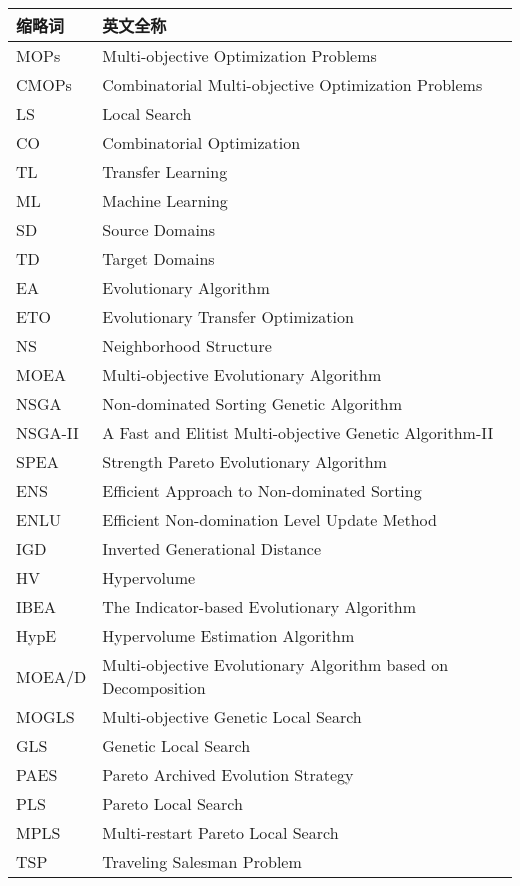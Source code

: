 \noindent\begin{longtabu} to \textwidth {|X[1,c]|X[4,c]|}\hline
缩略词 & 英文全称 \\ \hline
MOPs & Multi-objective Optimization Problems \\ \hline
CMOPs & Combinatorial Multi-objective Optimization Problems \\ \hline
LS & Local Search \\ \hline
CO & Combinatorial Optimization \\ \hline
TL & Transfer Learning \\ \hline
ML & Machine Learning \\ \hline
SD & Source Domains \\ \hline
TD & Target Domains \\ \hline
EA & Evolutionary Algorithm \\ \hline
ETO & Evolutionary Transfer Optimization \\ \hline
NS & Neighborhood Structure \\ \hline
MOEA & Multi-objective Evolutionary Algorithm \\ \hline
NSGA & Non-dominated Sorting Genetic Algorithm \\ \hline
NSGA-II & A Fast and Elitist Multi-objective Genetic Algorithm-II \\ \hline
SPEA & Strength Pareto Evolutionary Algorithm \\ \hline
ENS & Efficient Approach to Non-dominated Sorting \\ \hline
ENLU & Efficient Non-domination Level Update Method \\ \hline
IGD & Inverted Generational Distance \\ \hline
HV & Hypervolume \\ \hline
IBEA & The Indicator-based Evolutionary Algorithm \\ \hline
HypE & Hypervolume Estimation Algorithm \\ \hline
MOEA/D & Multi-objective Evolutionary Algorithm based on Decomposition \\ \hline
MOGLS & Multi-objective Genetic Local Search \\ \hline
GLS & Genetic Local Search \\ \hline
PAES & Pareto Archived Evolution Strategy \\ \hline
PLS & Pareto Local Search \\ \hline
MPLS & Multi-restart Pareto Local Search \\ \hline
TSP & Traveling Salesman Problem \\ \hline

\end{longtabu}

